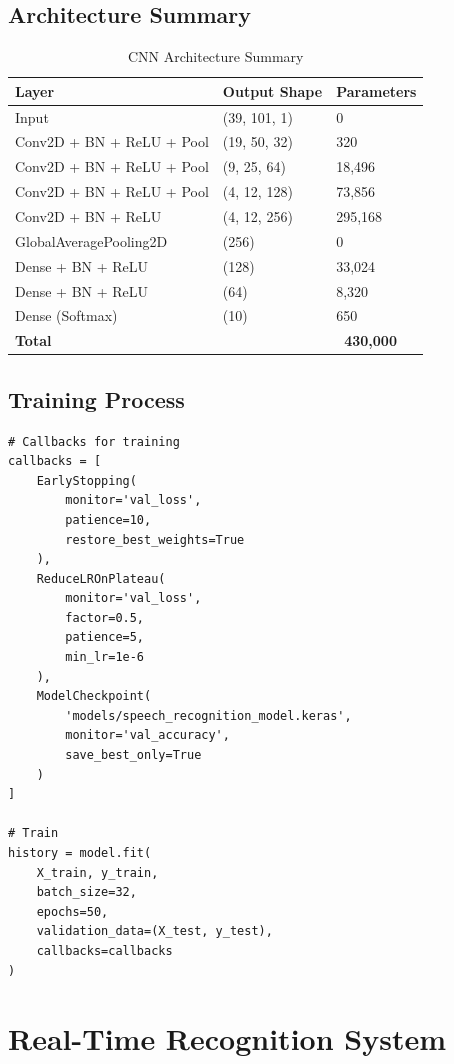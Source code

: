\documentclass[a4paper,12pt]{article}
\begin{document}
\subsection{Architecture Summary}
\begin{table}[h]
\centering
\begin{tabular}{|l|l|l|}
\hline
\textbf{Layer} & \textbf{Output Shape} & \textbf{Parameters} \\
\hline
Input & (39, 101, 1) & 0 \\
\hline
Conv2D + BN + ReLU + Pool & (19, 50, 32) & 320 \\
\hline
Conv2D + BN + ReLU + Pool & (9, 25, 64) & 18,496 \\
\hline
Conv2D + BN + ReLU + Pool & (4, 12, 128) & 73,856 \\
\hline
Conv2D + BN + ReLU & (4, 12, 256) & 295,168 \\
\hline
GlobalAveragePooling2D & (256) & 0 \\
\hline
Dense + BN + ReLU & (128) & 33,024 \\
\hline
Dense + BN + ReLU & (64) & 8,320 \\
\hline
Dense (Softmax) & (10) & 650 \\
\hline
\textbf{Total} & & \textbf{~430,000} \\
\hline
\end{tabular}
\caption{CNN Architecture Summary}
\end{table}

\subsection{Training Process}
\begin{lstlisting}[style=pythonstyle]
# Callbacks for training
callbacks = [
    EarlyStopping(
        monitor='val_loss',
        patience=10,
        restore_best_weights=True
    ),
    ReduceLROnPlateau(
        monitor='val_loss',
        factor=0.5,
        patience=5,
        min_lr=1e-6
    ),
    ModelCheckpoint(
        'models/speech_recognition_model.keras',
        monitor='val_accuracy',
        save_best_only=True
    )
]

# Train
history = model.fit(
    X_train, y_train,
    batch_size=32,
    epochs=50,
    validation_data=(X_test, y_test),
    callbacks=callbacks
)
\end{lstlisting}

\section{Real-Time Recognition System}
\end{document}
